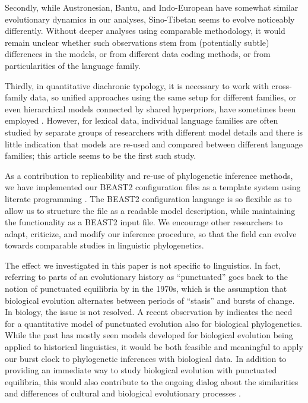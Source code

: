 \documentclass[]{rsos}%
\begin{document}
Secondly, while Austronesian, Bantu, and
Indo-European have somewhat similar evolutionary dynamics in our analyses, Sino-Tibetan
seems to evolve noticeably differently. Without deeper analyses using comparable methodology, it would remain
unclear whether such observations stem from (potentially subtle)
differences in the models, or from different data coding
methods, or from particularities of the language family.

Thirdly, in quantitative diachronic typology, it is necessary to work with cross-family
data, so unified approaches using the same setup for different families, or even
hierarchical models connected by shared hyperpriors, have sometimes been
employed \parencite{dunn2011evolved,jager2021phylogenetic}. However, for lexical
data, individual language families are often studied by separate groups of
researchers with different model details and there is little indication that
models are re-used and compared between different language families; this article seems to be the first such study.

As a contribution to replicability and re-use of phylogenetic inference methods,
we have implemented our BEAST2 configuration
files as a template system using literate programming \parencite{knuth1984literate}. The BEAST2 configuration language is so
flexible as to allow us to structure the file as a readable model description,
while maintaining the functionality as a BEAST2 input file. We encourage other
researchers to adapt, criticize, and modify our inference procedure, so that 
the field can evolve towards comparable studies in
linguistic phylogenetics.

The effect we investigated in this paper
is not specific to linguistics. In fact, referring to parts
of an evolutionary history as “punctuated” goes back to the notion of
punctuated equilibria by \textcite{eldredge1972punctuated} in the 1970s, which
is the
assumption that biological evolution alternates between periods of “stasis” and
bursts of change.
In biology, the issue is not resolved. A recent observation by
\textcite{janzen2021nucleotide} indicates the need for a quantitative model of
punctuated evolution also for biological phylogenetics.
While
the past has mostly seen models developed for biological evolution being applied to
historical linguistics, 
it would be both feasible and meaningful to apply our burst clock to
phylogenetic inferences with biological data.
In addition to providing an immediate way to study biological evolution with punctuated equilibria, 
this would also contribute to the ongoing dialog about the similarities
and differences of cultural and biological evolutionary processes \parencite{list2016alignments,levinson2012tools}.
\end{document}

